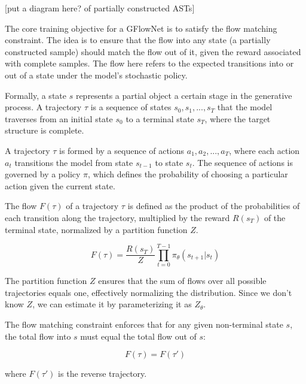 [put a diagram here? of partially constructed ASTs]

The core training objective for a GFlowNet is to satisfy the flow matching constraint. The idea is to ensure that the flow into any state (a partially constructed sample) should match the flow out of it, given the reward associated with complete samples. The flow here refers to the expected transitions into or out of a state under the model's stochastic policy. 

Formally, a state \( s \) represents a partial object a certain stage in the generative process. A trajectory \( \tau \) is a sequence of states \( s_0, s_1, ..., s_T \) that the model traverses from an initial state \( s_0 \) to a terminal state \( s_T \), where the target structure is complete.

A trajectory \( \tau \) is formed by a sequence of actions \( a_1, a_2, ..., a_T \), where each action \( a_t \) transitions the model from state \( s_{t-1} \) to state \( s_t \). The sequence of actions is governed by a policy \( \pi \), which defines the probability of choosing a particular action given the current state.


The flow \( F(\tau) \) of a trajectory \( \tau \) is defined as the product of the probabilities of each transition along the trajectory, multiplied by the reward \( R(s_T) \) of the terminal state, normalized by a partition function \( Z \).

\begin{equation} \label{eq:flow}
    F(\tau) = \frac{R(s_T)}{Z} \prod_{t=0}^{T-1} \pi_\theta(s_{t+1} | s_{t})
\end{equation}

The partition function \( Z \) ensures that the sum of flows over all possible trajectories equals one, effectively normalizing the distribution. Since we don't know \( Z \), we can estimate it by parameterizing it as \( Z_{\theta} \).

The flow matching constraint enforces that for any given non-terminal state \( s \), the total flow into \( s \) must equal the total flow out of \( s \):

\begin{equation} \label{eq:flow_match}
    F(\tau) = F(\tau')
\end{equation}

where \( F(\tau') \) is the reverse trajectory.

